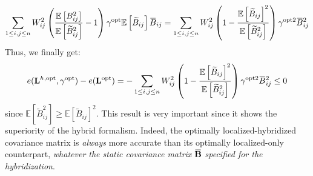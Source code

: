 \documentclass[12pt]{scrartcl}
\newcommand{\overbar}[1]{\mkern 1.5mu\overline{\mkern-1.5mu#1\mkern-1.5mu}\mkern 1.5mu}
\begin{document}
\begin{align}
\sum_{1 \le i,j \le n} W_{ij}^2 \left(\frac{\mathbb{E} \left[B^2_{ij}\right]}{\mathbb{E} \left[\widetilde{B}_{ij}^2\right]}  - 1  \right) \gamma^\mathrm{opt} \mathbb{E} \left[\widetilde{B}_{ij}\right] \overbar{B}_{ij} =  \sum_{1 \le i,j \le n} W_{ij}^2 \left(1 - \frac{\mathbb{E} \left[\widetilde{B}_{ij}\right]^2}{\mathbb{E}\left[ \widetilde{B}_{ij}^2 \right]}\right) \gamma^{\mathrm{opt}2} \overbar{B}_{ij}^2
\end{align}
Thus, we finally get:
\begin{align}
\label{eq:hyb_better}
e(\mathbf{L}^{h,\mathrm{opt}},\gamma^\mathrm{opt}) - e(\mathbf{L}^\mathrm{opt}) = - \sum_{1 \le i,j \le n} W_{ij}^2 \left(1 - \frac{\mathbb{E} \left[\widetilde{B}_{ij}\right]^2}{\mathbb{E}\left[ \widetilde{B}_{ij}^2 \right]}\right) \gamma^{\mathrm{opt}2} \overbar{B}_{ij}^2 \le 0
\end{align}
since $\mathbb{E}\left[ \widetilde{B}_{ij}^2 \right] \ge \mathbb{E} \left[\widetilde{B}_{ij}\right]^2$. This result is very important since it shows the superiority of the hybrid formalism. Indeed, the optimally localized-hybridized covariance matrix is \textit{always} more accurate than its optimally localized-only counterpart, \textit{whatever the static covariance matrix} $\overbar{\mathbf{B}}$ \textit{specified for the hybridization}.
\end{document}
